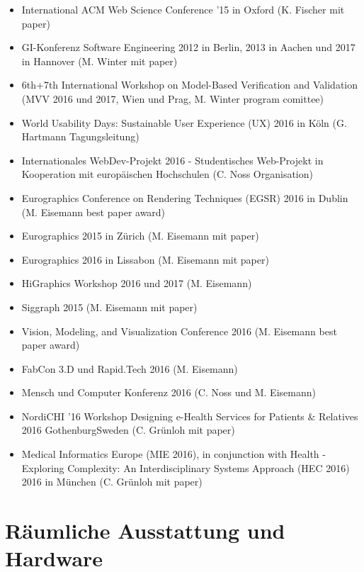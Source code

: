\begin{itemize}
\tightlist
\item
  International ACM Web Science Conference '15 in Oxford (K. Fischer mit
  paper)
\item
  GI-Konferenz Software Engineering 2012 in Berlin, 2013 in Aachen und
  2017 in Hannover (M. Winter mit paper)
\item
  6th+7th International Workshop on Model-Based Verification and
  Validation (MVV 2016 und 2017, Wien und Prag, M. Winter program
  comittee)
\item
  World Usability Days: Sustainable User Experience (UX) 2016 in Köln
  (G. Hartmann Tagungsleitung)
\item
  Internationales WebDev-Projekt 2016 - Studentisches Web-Projekt in
  Kooperation mit europäischen Hochschulen (C. Noss Organisation)
\item
  Eurographics Conference on Rendering Techniques (EGSR) 2016 in Dublin
  (M. Eisemann best paper award)
\item
  Eurographics 2015 in Zürich (M. Eisemann mit paper)
\item
  Eurographics 2016 in Lissabon (M. Eisemann mit paper)
\item
  HiGraphics Workshop 2016 und 2017 (M. Eisemann)
\item
  Siggraph 2015 (M. Eisemann mit paper)
\item
  Vision, Modeling, and Visualization Conference 2016 (M. Eisemann best
  paper award)
\item
  FabCon 3.D und Rapid.Tech 2016 (M. Eisemann)
\item
  Mensch und Computer Konferenz 2016 (C. Noss und M. Eisemann)
\item
  NordiCHI '16 Workshop Designing e-Health Services for Patients \&
  Relatives 2016 GothenburgSweden (C. Grünloh mit paper)
\item
  Medical Informatics Europe (MIE 2016), in conjunction with Health -
  Exploring Complexity: An Interdisciplinary Systems Approach (HEC 2016)
  2016 in München (C. Grünloh mit paper)
\end{itemize}

\section{Räumliche Ausstattung und
Hardware\label{/mi-2017/selbstbericht/0800-ausstattung/0000-ausstattung}}\label{ruxe4umliche-ausstattung-und-hardwarepathlabelmi-2017selbstbericht0800-ausstattung0000-ausstattung}


